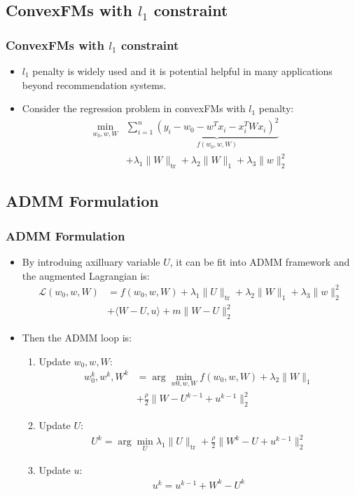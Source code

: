 \documentclass{beamer}
\begin{document}
\subsection{ConvexFMs with $l_1$ constraint}
\begin{frame}
\frametitle{ConvexFMs with $l_1$ constraint}
\begin{itemize}
  \item $l_1$ penalty is widely used and it is potential helpful in many applications beyond recommendation systems.
  \item Consider the regression problem in convexFMs with $l_1$ penalty:
    \begin{align*}
      \min_{w_0, w, W} & \sum_{i = 1}^n \underbrace{(y_i - w_0 - w^Tx_i - x_i^T W x_i)^2}_{f(w_0, w, W)} \\
      & + \lambda_1 \|W\|_{\text{tr}} + \lambda_2 \|W\|_1 + \lambda_3 \|w\|_2^2
    \end{align*}
\end{itemize}
\end{frame}

\subsection{ADMM Formulation}
\begin{frame}
\frametitle{ADMM Formulation}
\begin{itemize}
  \item By introduing axilluary variable $U$, it can be fit into ADMM framework and the augmented Lagrangian is:
    \begin{align*}
      \mathcal{L}(w_0, w, W) &= f(w_0, w, W) + \lambda_1 \|U\|_{\text{tr}} + \lambda_2 \|W\|_1 + \lambda_3 \|w\|_2^2 \\
      &+ \langle W - U, u \rangle + m\|W - U\|_2^2 
    \end{align*}
  \item Then the ADMM loop is:
    \begin{enumerate}
    \item Update $w_0, w, W$:
    \begin{align*}
        w_0^k, w^k, W^k &= \arg\min_{w0, w, W} f(w_0, w, W) + \lambda_2 \|W\|_1 \\
        &+ \frac{\rho}{2} \|W - U^{k - 1} + u^{k - 1}\|_2^2
    \end{align*}
    \item Update $U$:
    \begin{align*}
        U^k = \arg\min_U \lambda_1 \|U\|_{\text{tr}} + \frac{\rho}{2}\|W^k - U + u^{k-1}\|_2^2
    \end{align*}
    \item Update $u$:
    \begin{align*}
        u^k = u^{k - 1} + W^k - U^k
    \end{align*}
\end{enumerate}
\end{itemize}
\end{frame}
\end{document}
